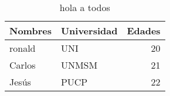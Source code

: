 \begin{table}
\centering
\caption{hola a todos}
\begin{tabular}{llr}
\toprule
Nombres & Universidad &  Edades \\
\midrule
 ronald &         UNI &      20 \\
 Carlos &       UNMSM &      21 \\
  Jesús &        PUCP &      22 \\
\bottomrule
\end{tabular}
\end{table}
